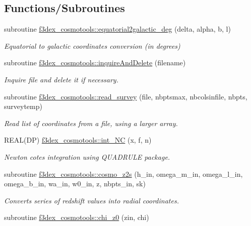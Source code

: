 \subsection*{Functions/Subroutines}
\begin{DoxyCompactItemize}
\item 
subroutine \hyperlink{namespacef3dex__cosmotools_abeb005e8bef92ebc0927b69db637906d}{f3dex\_\-cosmotools::equatorial2galactic\_\-deg} (delta, alpha, b, l)
\begin{DoxyCompactList}\small\item\em Equatorial to galactic coordinates conversion (in degrees) \end{DoxyCompactList}\item 
subroutine \hyperlink{namespacef3dex__cosmotools_a0caf479bc891741c90e36f878444e333}{f3dex\_\-cosmotools::inquireAndDelete} (filename)
\begin{DoxyCompactList}\small\item\em Inquire file and delete it if necessary. \end{DoxyCompactList}\item 
subroutine \hyperlink{namespacef3dex__cosmotools_a36578d36cffe32d26a9fd914d032ef3a}{f3dex\_\-cosmotools::read\_\-survey} (file, nbptsmax, nbcolsinfile, nbpts, surveytemp)
\begin{DoxyCompactList}\small\item\em Read list of coordinates from a file, using a larger array. \end{DoxyCompactList}\item 
REAL(DP) \hyperlink{namespacef3dex__cosmotools_a25e2703c39b2d99c864537823f2f8402}{f3dex\_\-cosmotools::int\_\-NC} (x, f, n)
\begin{DoxyCompactList}\small\item\em Newton cotes integration using QUADRULE package. \end{DoxyCompactList}\item 
subroutine \hyperlink{namespacef3dex__cosmotools_a78ae43d2bd5f180e65c710dc694bcee4}{f3dex\_\-cosmotools::cosmo\_\-z2s} (h\_\-in, omega\_\-m\_\-in, omega\_\-l\_\-in, omega\_\-b\_\-in, wa\_\-in, w0\_\-in, z, nbpts\_\-in, sk)
\begin{DoxyCompactList}\small\item\em Converts series of redshift values into radial coordinates. \end{DoxyCompactList}\item 
subroutine \hyperlink{namespacef3dex__cosmotools_abdbb37c7c522bf29ebf089412b9d7854}{f3dex\_\-cosmotools::chi\_\-z0} (zin, chi)

\end{DoxyCompactItemize}
